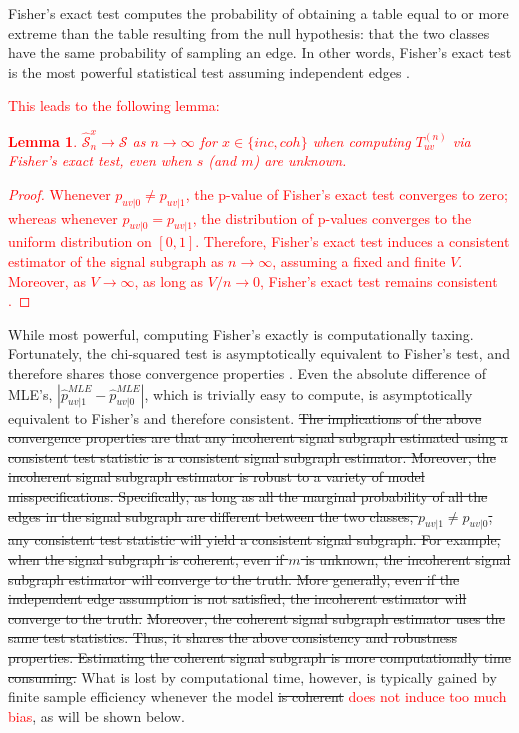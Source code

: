 \documentclass[10pt,journal,cspaper,compsoc]{IEEEtran}
\providecommand{\tr}[1]{\textcolor{red}{#1}}
\providecommand{\mc}[1]{\mathcal{#1}}
\providecommand{\wh}[1]{\widehat{#1}}
\providecommand{\mhc}[1]{\widehat{\mathcal{#1}}}
\newcommand{\conv}{\rightarrow}
\newtheorem{Lem}{Lemma}[section]
\begin{document}
Fisher's exact test computes the probability of obtaining a table equal to or more extreme than the table resulting from the null hypothesis: that the two classes have the same probability of sampling an edge.  In other words, Fisher's exact test is the most powerful statistical test assuming independent edges \cite{Rice1995}.  \tr{This leads to the following lemma:
% 
\begin{Lem}
	$\mhc{S}^{x}_n \to \mc{S}$ as $n \to \infty$ for $x \in \{inc,coh\}$ when computing $T_{uv}^{(n)}$ via Fisher's exact test, even when $s$ (and $m$) are unknown. 
\end{Lem}
\begin{proof}
	Whenever $p_{uv|0}\neq p_{uv|1}$, the p-value of Fisher's exact test converges to zero; whereas whenever $p_{uv|0}=p_{uv|1}$, the distribution of p-values converges to the uniform distribution on $[0,1]$.  Therefore, Fisher's exact test induces a consistent estimator of the signal subgraph as $n \conv \infty$, assuming a fixed and finite $V$.  Moreover, as $V \conv \infty$, as long as $V/n \conv 0$, Fisher's exact test remains consistent \cite{Rice1995}. 
\end{proof}
}
While most powerful, computing Fisher's exactly is computationally taxing.  Fortunately, the chi-squared test is asymptotically equivalent to Fisher's test, and therefore shares those convergence properties \cite{Rice1995}.  Even the absolute difference of MLE's, $|\wh{p}_{uv|1}^{MLE}-\wh{p}_{uv|0}^{MLE}|$, which is trivially easy to compute, is asymptotically equivalent to Fisher's \cite{Rice1995} and therefore consistent. 
% 
\sout{The implications of the above convergence properties are that any incoherent signal subgraph estimated using a consistent test statistic is a consistent signal subgraph estimator.  Moreover, the incoherent signal subgraph estimator is robust to a variety of model misspecifications.  Specifically, as long as all the marginal probability of all the edges in the signal subgraph are different between the two classes, $p_{uv|1}\neq p_{uv|0}$, any consistent test statistic will yield a consistent signal subgraph.  For example, when the signal subgraph is coherent, even if $m$ is unknown, the incoherent signal subgraph estimator will converge to the truth.  More generally, even if the independent edge assumption is not satisfied, the incoherent estimator will converge to the truth.}
% 
\sout{Moreover, the coherent signal subgraph estimator uses the same test statistics.  Thus, it shares the above consistency and robustness properties.  Estimating the coherent signal subgraph is more computationally time consuming.}
% 
What is lost by computational time, however, is typically gained by finite sample efficiency whenever the model  \sout{is coherent} \tr{does not induce too much bias}, as will be shown below.
\end{document}
